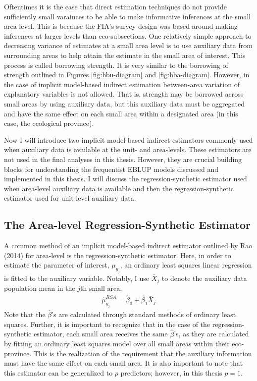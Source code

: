 \documentclass[12pt,twoside]{reedthesis}
\begin{document}
Oftentimes it is the case that direct estimation techniques do not provide sufficiently small varainces to be able to make informative inferences at the small area level. This is because the FIA's survey design was based around making inferences at larger levels than eco-subsections. One relatively simple approach to decreasing variance of estimates at a small area level is to use auxiliary data from surrounding areas to help attain the estimate in the small area of interest. This process is called borrowing strength. It is very similar to the borrowing of strength outlined in Figures \ref{fig:hbu-diagram} and \ref{fig:hba-diagram}. However, in the case of implicit model-based indirect estimation between-area variation of explanatory variables is not allowed. That is, strength may be borrowed across small areas by using auxiliary data, but this auxiliary data must be aggregated and have the same effect on each small area within a designated area (in this case, the ecological province).

Now I will introduce two implicit model-based indirect estimators commonly used when auxiliary data is available at the unit- and area-levels. These estimators are not used in the final analyses in this thesis. However, they are crucial building blocks for understanding the frequentist EBLUP models discussed and implemented in this thesis. I will discuss the regression-synthetic estimator used when area-level auxiliary data is available and then the regression-synthetic estimator used for unit-level auxiliary data.

\hypertarget{the-area-level-regression-synthetic-estimator}{%
\subsection{The Area-level Regression-Synthetic Estimator}\label{the-area-level-regression-synthetic-estimator}}

A common method of an implicit model-based indirect estimator outlined by Rao (2014) for area-level is the regression-synthetic estimator. Here, in order to estimate the parameter of interest, \(\mu_{y_j}\), an ordinary least squares linear regression is fitted to the auxiliary variable. Notably, I use \(\bar X_j\) to denote the auxiliary data population mean in the \(j\)th small area.
\begin{align}
\hat\mu_{y_j}^{RSA} = \hat\beta_0 + \hat\beta_1 \bar X_{j}
\end{align}
Note that the \(\hat \beta\)'s are calculated through standard methods of ordinary least squares. Further, it is important to recognize that in the case of the regression-synthetic estimator, each small area receives the same \(\hat\beta\)'s, as they are calculated by fitting an ordinary least squares model over all small areas within their eco-province. This is the realization of the requirement that the auxiliary information must have the same effect on each small area. It is also important to note that this estimator can be generalized to \(p\) predictors; however, in this thesis \(p=1\).
\end{document}
